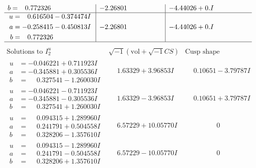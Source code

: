 \documentclass[1p]{elsarticle_modified}
\theoremstyle{definition}
\newcommand{\I}{\sqrt{-1}}
\begin{document}
$$\begin{array}{c|c|c}
\begin{aligned}
b &= \phantom{-}0.772326\phantom{ +0.000000I}\end{aligned}
 & -2.26801\phantom{ +0.000000I} & -4.44026 + 0. I\phantom{ +0.000000I} \\ \hline\begin{aligned}
u &= \phantom{-}0.616504 - 0.374474 I \\
a &= -0.258415 - 0.450813 I \\
b &= \phantom{-}0.772326\phantom{ +0.000000I}\end{aligned}
 & -2.26801\phantom{ +0.000000I} & -4.44026 + 0. I\phantom{ +0.000000I}\\
 \hline 
 \end{array}$$\newpage$$\begin{array}{c|c|c}  
\text{Solutions to }I^u_{2}& \I (\text{vol} + \sqrt{-1}CS) & \text{Cusp shape}\\
 \hline 
\begin{aligned}
u &= -0.046221 + 0.711923 I \\
a &= -0.345881 + 0.305536 I \\
b &= \phantom{-}0.327541 - 1.260030 I\end{aligned}
 & \phantom{-}1.63329 + 3.96853 I & \phantom{-}0.10651 - 3.79787 I \\ \hline\begin{aligned}
u &= -0.046221 - 0.711923 I \\
a &= -0.345881 - 0.305536 I \\
b &= \phantom{-}0.327541 + 1.260030 I\end{aligned}
 & \phantom{-}1.63329 - 3.96853 I & \phantom{-}0.10651 + 3.79787 I \\ \hline\begin{aligned}
u &= \phantom{-}0.094315 + 1.289960 I \\
a &= \phantom{-}0.241791 + 0.504558 I \\
b &= \phantom{-}0.328206 - 1.357610 I\end{aligned}
 & \phantom{-}6.57229 + 10.05770 I & \phantom{-0.000000 } 0 \\ \hline\begin{aligned}
u &= \phantom{-}0.094315 - 1.289960 I \\
a &= \phantom{-}0.241791 - 0.504558 I \\
b &= \phantom{-}0.328206 + 1.357610 I\end{aligned}
 & \phantom{-}6.57229 - 10.05770 I & \phantom{-0.000000 } 0 \\ \hline\begin{aligned}

\end{aligned}
\end{array}$$
\end{document}

